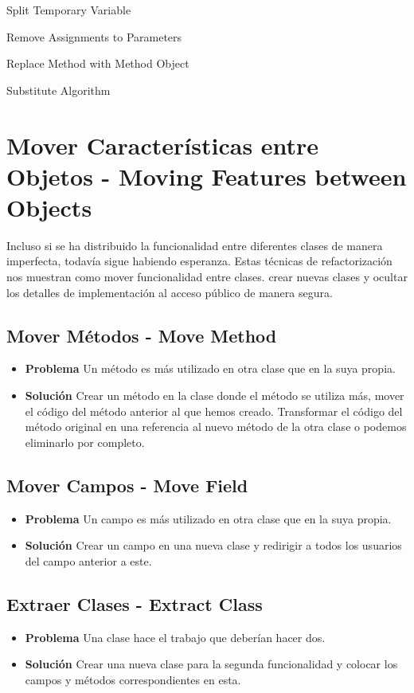 \documentclass[11pt,a4paper,oneside]{book}
\begin{document}
    Split Temporary Variable
    
    Remove Assignments to Parameters
    
    Replace Method with Method Object
    
    Substitute Algorithm


\section{Mover Características entre Objetos - Moving Features between Objects}

\label{renombrarmetodo} Incluso si se ha distribuido la funcionalidad entre diferentes clases de manera imperfecta, todavía sigue habiendo esperanza.
Estas técnicas de refactorización nos muestran como mover funcionalidad entre clases. crear nuevas clases y ocultar los detalles de implementación al acceso público de manera segura.


\subsection{Mover Métodos - Move Method}  
\begin{itemize}
    \item \textbf{Problema} Un método es más utilizado en otra clase que en la suya propia.
    \item \textbf{Solución} Crear un método en la clase donde el método se utiliza más, mover el código del método anterior al que hemos creado. Transformar el código del método original en una referencia al nuevo método de la otra clase o podemos eliminarlo por completo.
\end{itemize}
    
\subsection{Mover Campos - Move Field}
\begin{itemize}
    \item \textbf{Problema} Un campo es más utilizado en otra clase que en la suya propia.
    \item \textbf{Solución} Crear un campo en una nueva clase y redirigir a todos los usuarios del campo anterior a este.
\end{itemize}
    
\subsection{Extraer Clases - Extract Class}
\begin{itemize}
    \item \textbf{Problema} Una clase hace el trabajo que deberían hacer dos.
    \item \textbf{Solución} Crear una nueva clase para la segunda funcionalidad y colocar los campos y métodos correspondientes en esta.
\end{itemize}
    
\end{document}
